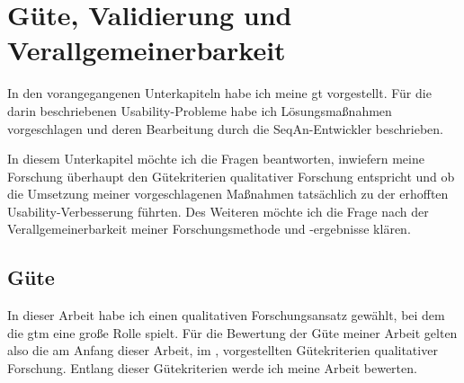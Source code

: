\section{Güte, Validierung und Verallgemeinerbarkeit}
\label{sec:validierung}

In den vorangegangenen Unterkapiteln habe ich meine \gls{gt} vorgestellt. Für die darin beschriebenen Usability-Probleme habe ich Lösungsmaßnahmen vorgeschlagen und deren Bearbeitung durch die SeqAn-Entwickler beschrieben.

In diesem Unterkapitel möchte ich die Fragen beantworten, inwiefern meine Forschung überhaupt den Gütekriterien qualitativer Forschung entspricht und ob die Umsetzung meiner vorgeschlagenen Maßnahmen tatsächlich zu der erhofften Usability-Verbesserung führten. Des Weiteren möchte ich die Frage nach der Verallgemeinerbarkeit meiner Forschungsmethode und -ergebnisse klären.

\subsection{Güte}

In dieser Arbeit habe ich einen qualitativen Forschungsansatz gewählt, bei dem die \gls{gtm} eine große Rolle spielt. Für die Bewertung der Güte meiner Arbeit gelten also die am Anfang dieser Arbeit, im , vorgestellten Gütekriterien qualitativer Forschung. Entlang dieser Gütekriterien werde ich meine Arbeit bewerten.

